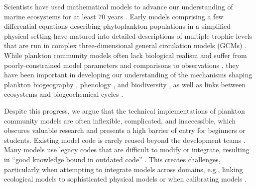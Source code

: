 \documentclass[gmd, manuscript]{copernicus}
\begin{document}
Scientists have used mathematical models to advance our understanding of marine ecosystems for at least 70 years \citep{Sverdrup1953OnPhytoplankton, Fasham1990a, Gentleman2002a, Follows2007EmergentOcean, Acevedo-Trejos2016}. Early models comprising a few differential equations describing phytoplankton populations in a simplified physical setting \citep{Evans1985ACycles, Fasham1990a} have matured into detailed descriptions of multiple trophic levels that are run in complex three-dimensional general circulation models (GCMs) \citep[e.g.][]{Dutkiewicz2020DimensionsDiversity}. While plankton community models often lack biological realism and suffer from poorly-constrained model parameters and comparisons to observations \citep{Anderson2005}, they have been important in developing our understanding of the mechanisms shaping plankton biogeography \citep[e.g.][]{Follows2007EmergentOcean}, phenology \citep[e.g.][]{Taylor1993SeasonalNitrogen}, and biodiversity \citep[e.g.][]{Barton2010b, Acevedo-Trejos2015c}, as well as links between ecosystems and biogeochemical cycles \citep[e.g.][]{Fasham1990a, Sarmiento1998SimulatedWarming, Merico2006IsSystem, Dutkiewicz2009}.

Despite this progress, we argue that the technical implementations of plankton community models are often inflexible, complicated, and inaccessible, which obscures valuable research and presents a high barrier of entry for beginners or students. Existing model code is rarely reused beyond the development teams \citep{Belete2017AnTesting}. Many models use legacy codes that are difficult to modify or integrate, resulting in “good knowledge bound in outdated code” \citep{Argent2004AnSemantics}. This creates challenges, particularly when attempting to integrate models across domains, e.g., linking ecological models to sophisticated physical models \citep{Koralewski2019CouplingModels} or when calibrating models \citep{Steenbeek2021MakingPerspective}. 
\end{document}
